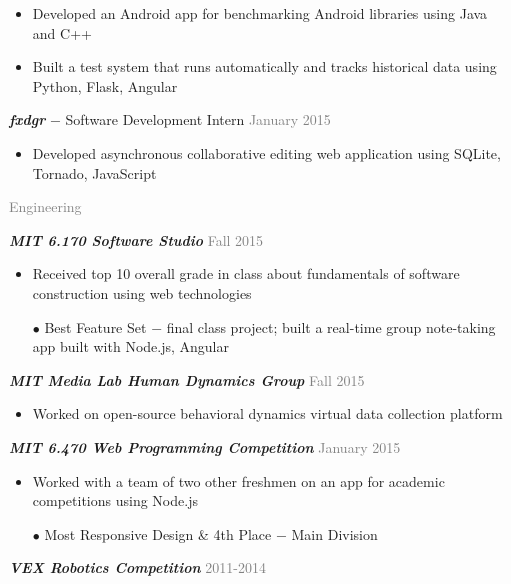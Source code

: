\documentclass[11pt]{article}
\newcommand{\rsection}[1]{\vspace{1.5em}\textcolor{gray}{\Large \robotoslab #1}\vspace{0.5em}}
\newcommand{\bt}[1]{\textit{\textbf{#1}}} %
\newcommand{\gap}[0]{\vspace{0.5em}} %
\newcommand{\dash}[0]{ $-$ } %
\newcommand{\gray}[1]{\textcolor{gray}{#1}}
\begin{document}
\begin{itemize}
\item Developed an Android app for benchmarking Android libraries using Java and C++
\item Built a test system that runs automatically and tracks historical data using Python, Flask, Angular
\end{itemize}

\gap

\bt{fxdgr}\dash Software Development Intern \hfill \gray{January 2015}

\begin{itemize}
\item Developed asynchronous collaborative editing web application using SQLite, Tornado, JavaScript
\end{itemize}

\rsection{Engineering}

\bt{MIT 6.170 Software Studio} \hfill \gray{Fall 2015}

\begin{itemize}
\item Received top 10 overall grade in class about fundamentals of software construction using web technologies
\item[$\bullet$] Best Feature Set\dash final class project; built a real-time group note-taking app built with Node.js, Angular
\end{itemize}

\gap

\bt{MIT Media Lab Human Dynamics Group} \hfill \gray{Fall 2015}

\begin{itemize}
\item Worked on open-source behavioral dynamics virtual data collection platform
\end{itemize}

\gap

\bt{MIT 6.470 Web Programming Competition} \hfill \gray{January 2015}

\begin{itemize}
\item Worked with a team of two other freshmen on an app for academic competitions using Node.js
\item[$\bullet$] Most Responsive Design \& 4th Place\dash Main Division
\end{itemize}

\gap

\bt{VEX Robotics Competition} \hfill \gray{2011-2014}
\end{document}
